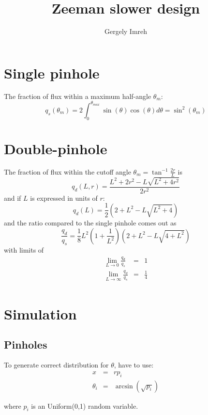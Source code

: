 \documentclass[11pt,a4paper]{article}
\author{Gergely Imreh}
\title{Zeeman slower design}
\begin{document}
\maketitle

\section{Single pinhole}

The fraction of flux within a maximum half-angle $\theta_{m}$:
\begin{equation}
q_s(\theta_{m}) = 2 \int_{0}^{\theta_{max}} \sin(\theta) \cos(\theta) d\theta = \sin^2(\theta_{m})
\end{equation}

\section{Double-pinhole}

The fraction of flux within the cutoff angle $\theta_{m} = \tan^{-1}\frac{2 r}{L}$ is
\begin{equation}
q_d(L, r) = \frac{L^2 + 2 r^2 - L \sqrt{L^2 + 4 r^2}}{2 r^2}
\end{equation}
and if $L$ is expressed in units of $r$:
\begin{equation}
q_d(L) = \frac{1}{2}\left(2 + L^2 - L \sqrt{L^2 + 4}\right)
\end{equation}
and the ratio compared to the single pinhole comes out as
\begin{equation}
\frac{q_d}{q_s} = \frac{1}{8} L^2 \left(1 + \frac{1}{L^2}\right) \left(2 + L^2 - L\sqrt{4 + L^2}\right)
\end{equation}
with limits of
\begin{eqnarray}
\lim_{L \rightarrow 0} \frac{q_d}{q_s} &=& 1 \\
\lim_{L \rightarrow \infty} \frac{q_d}{q_s} &=& \frac{1}{4} \\
\end{eqnarray}

\section{Simulation}

\subsection{Pinholes}

To generate correct distribution for $\theta$, have to use:
\begin{eqnarray}
x &=& r p_i \\
\theta_i &=& \arcsin(\sqrt{p_i})
\end{eqnarray}


where $p_i$ is an Uniform(0,1) random variable.
\end{document}

